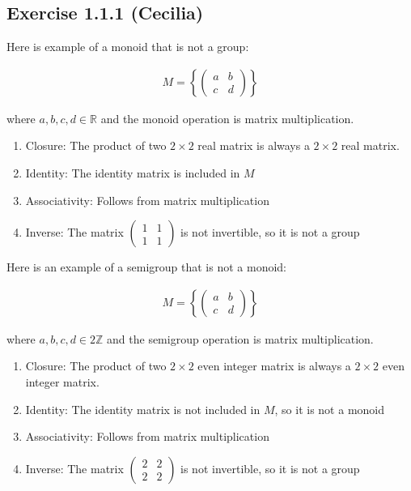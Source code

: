 \subsection*{Exercise 1.1.1 (Cecilia)}

Here is example of a monoid that is not a group:

\begin{eqnarray*}
    M = \left\{\left(\begin{array}{cc}
    a & b \\
    c & d
  \end{array}\right)\right\}
\end{eqnarray*}

where $ a,b,c,d \in \mathbb{R} $ and the monoid operation is matrix multiplication.

\begin{enumerate}
    \item{Closure: The product of two $ 2 \times 2 $ real matrix is always a $ 2 \times 2 $ real matrix.}
    \item{Identity: The identity matrix is included in $ M $}
    \item{Associativity: Follows from matrix multiplication}
    \item{Inverse: The matrix $ \left(\begin{array}{cc}
        1 & 1 \\
        1 & 1
      \end{array}\right) $ is not invertible, so it is not a group}
\end{enumerate}

Here is an example of a semigroup that is not a monoid:

\begin{eqnarray*}
    M = \left\{\left(\begin{array}{cc}
    a & b \\
    c & d
  \end{array}\right)\right\}
\end{eqnarray*}

where $ a,b,c,d \in 2\mathbb{Z} $ and the semigroup operation is matrix multiplication.

\begin{enumerate}
    \item{Closure: The product of two $ 2 \times 2 $ even integer matrix is always a $ 2 \times 2 $ even integer matrix.}
    \item{Identity: The identity matrix is not included in $ M $, so it is not a monoid}
    \item{Associativity: Follows from matrix multiplication}
    \item{Inverse: The matrix $ \left(\begin{array}{cc}
        2 & 2 \\
        2 & 2
      \end{array}\right) $ is not invertible, so it is not a group}
\end{enumerate}